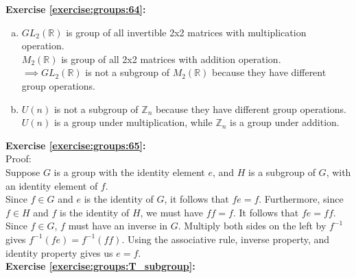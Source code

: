 \noindent\textbf{Exercise \ref{exercise:groups:64}:}
\begin{enumerate}[(a)]
\item
$GL_2({\mathbb R})$ is group of all invertible 2x2 matrices with multiplication operation.\\
$M_2({\mathbb R})$ is group of all 2x2 matrices with addition operation.\\
$\implies GL_2({\mathbb R})$ is not a subgroup of $M_2({\mathbb R})$ because they have different group operations.

\item
$U(n)$ is not a subgroup of ${\mathbb Z}_n$ because they have different group operations.\\
$U(n)$ is a group under multiplication, while ${\mathbb Z}_n$ is a group under addition.
\end{enumerate}

\noindent\textbf{Exercise \ref{exercise:groups:65}:}
\\
Proof:  \\
Suppose $G$ is a group with the identity element $e$, and $H$ is a subgroup of $G$, with an identity element of $f$.\\
Since $f \in G$ and $e$ is the identity of $G$, it follows that $fe=f$. Furthermore, since $f \in H$ and $f$ is the identity of $H$, we must have  $ff=f$. It follows that $fe = ff$.  Since $f \in G$, 
$f$ must have an inverse in $G$.  Multiply both sides on the left by $f^{-1}$ gives
$f^{-1}(fe) = f^{-1}(ff)$. Using the associative rule, inverse property, and identity property gives us $e=f$. 
\\

\noindent\textbf{Exercise \ref{exercise:groups:T_subgroup}:}


